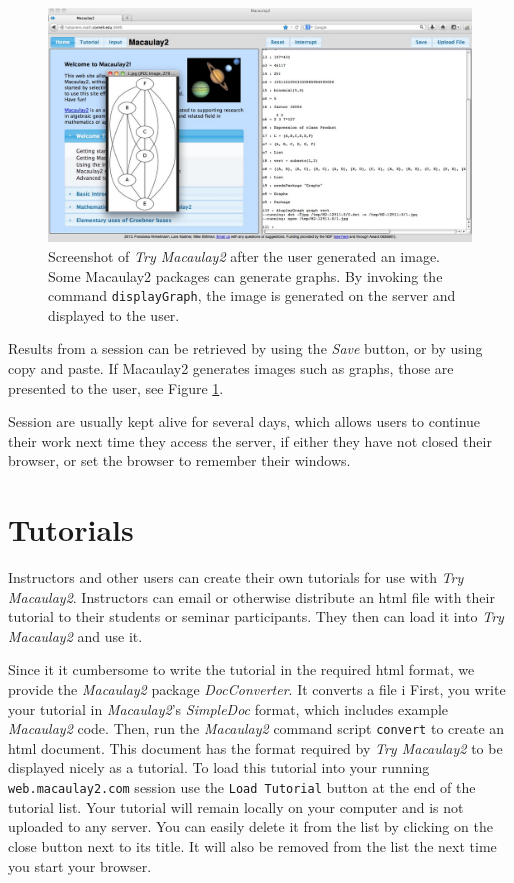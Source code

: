\documentclass[twocolumn]{article}
\def\tryM2{{\it Try Macaulay2}}
\def\M2{{\it Macaulay2}}
\begin{document}
\begin{figure}[htb]
    \includegraphics[width=.95\textwidth]{withGraph.jpg}
    \caption{Screenshot of \tryM2 after the user
      generated an image. Some Macaulay2 packages can generate
      graphs. By invoking the command {\tt displayGraph}, the image is
      generated on the server and displayed to the user.}
    \label{fig:graph}
\end{figure}

Results from a session can be retrieved by using the {\it Save}
button, or by using copy and paste. If Macaulay2 generates
images such as graphs, those are presented to the user, see Figure \ref{fig:graph}.


Session are usually kept alive for several days, which allows users to
continue their work next time they access the server, if either they
have not closed their browser, or set the browser to remember their
windows.

\section{Tutorials}
Instructors and other users can create their own tutorials for use with \tryM2. Instructors can email or otherwise distribute an html file with their tutorial to their students or seminar participants. They then can load it into \tryM2 and use it. 

Since it it cumbersome to write the tutorial in the required html format, we provide the \M2 package {\it DocConverter}. It converts a file i  
First, you write your tutorial in \M2's {\it SimpleDoc} format, which includes example \M2 code.
Then, run the \M2 command script {\tt convert} to create an html document. This document has the format required by \tryM2 to be displayed nicely as a tutorial. To load this tutorial into your running {\tt web.macaulay2.com} session use the {\tt Load Tutorial} button at the end of the tutorial list.
Your tutorial will remain locally on your computer and is not uploaded to any server. You can easily delete it from the list by clicking on the close button next to its title. It will also be removed from the list the next time you start your browser. 
\end{document}
